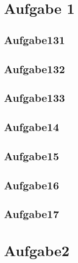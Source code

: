 \documentclass[12pt]{article}
\begin{document}
\lstset{language=C}

\section{Aufgabe 1}
\subsection{Aufgabe131}


\subsection{Aufgabe132}


\subsection{Aufgabe133}


\subsection{Aufgabe14}


\subsection{Aufgabe15}


\subsection{Aufgabe16}


\subsection{Aufgabe17}


\section{Aufgabe2}

\end{document}
